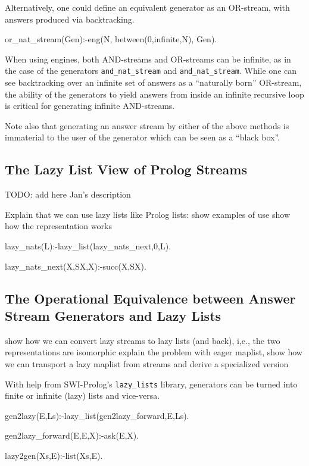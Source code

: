\documentclass{new_tlp}
\begin{document}
Alternatively, one could define 
an equivalent generator as an OR-stream,  with answers 
produced via  backtracking.
\begin{code}
or_nat_stream(Gen):-eng(N, between(0,infinite,N), Gen).
\end{code}

When using engines, 
both AND-streams and OR-streams can be infinite, as in the
case of the generators {\tt and\_nat\_stream} and {\tt and\_nat\_stream}.
While one can see backtracking over an infinite set of answers as
a ``naturally born'' OR-stream, the ability of the generators to
yield answers from inside an infinite recursive loop is critical
for generating infinite AND-streams.

Note also that generating an answer stream by either of the above methods
is immaterial to the user of the generator which can be seen as a ``black box''.

\subsection{The Lazy List View of Prolog Streams}

{\Large TODO: add here Jan's description}

   Explain that we can use lazy lists like Prolog lists:
   \BI
   \I
    show examples of use
   \I show how the representation works
 \EI
 
 \begin{code}
%
lazy_nats(L):-lazy_list(lazy_nats_next,0,L).

lazy_nats_next(X,SX,X):-succ(X,SX).
\end{code}
   
\subsection{The Operational Equivalence between Answer Stream Generators and Lazy Lists}

\BI

   \I show how we can convert lazy streams to lazy lists (and back), i,e., the two representations are isomorphic
   \I explain the problem with eager maplist, show how we can transport a lazy maplist from streams and derive a specialized version


\EI

With help from SWI-Prolog's {\tt lazy\_lists} library, generators can be turned into finite or infinite (lazy) lists and vice-versa.
\begin{code}
%
gen2lazy(E,Ls):-lazy_list(gen2lazy_forward,E,Ls).

gen2lazy_forward(E,E,X):-ask(E,X).

%
lazy2gen(Xs,E):-list(Xs,E).

\end{code}
\end{document}
